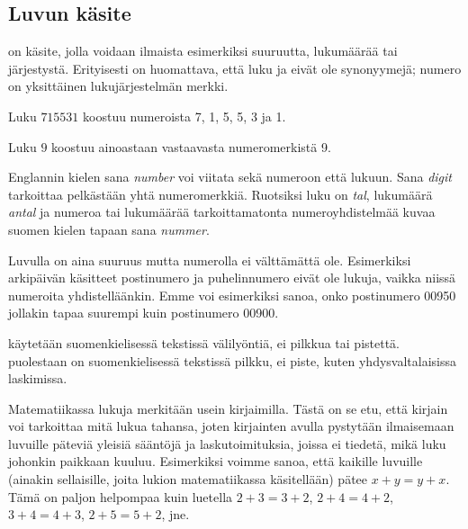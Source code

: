 


\subsection*{Luvun käsite}

 on käsite, jolla voidaan ilmaista esimerkiksi suuruutta, lukumäärää tai järjestystä. Erityisesti on huomattava, että
luku ja  eivät ole synonyymejä; numero on yksittäinen lukujärjestelmän merkki.

\begin{esimerkki}
	Luku $715531$ koostuu numeroista 7, 1, 5, 5, 3 ja 1.
	
	Luku $9$ koostuu ainoastaan vastaavasta numeromerkistä 9.
\end{esimerkki}

Englannin kielen sana \textit{number} voi viitata sekä numeroon että lukuun.
Sana \textit{digit} tarkoittaa pelkästään yhtä numeromerkkiä.
Ruotsiksi luku on \textit{tal}, lukumäärä \textit{antal} ja numeroa tai lukumäärää tarkoittamatonta
numeroyhdistelmää kuvaa suomen kielen tapaan sana \textit{nummer}.

Luvulla on aina suuruus mutta numerolla ei välttämättä ole. Esimerkiksi arkipäivän käsitteet
postinumero ja puhelinnumero eivät ole lukuja, vaikka niissä numeroita yhdistelläänkin. 
Emme voi esimerkiksi sanoa, onko postinumero 00950 jollakin tapaa suurempi kuin postinumero 00900.

 käytetään suomenkielisessä tekstissä välilyöntiä, ei pilkkua tai pistettä.
 puolestaan on suomenkielisessä tekstissä pilkku, ei piste, kuten yhdysvaltalaisissa laskimissa.

Matematiikassa lukuja merkitään usein kirjaimilla. Tästä on se etu, että kirjain voi tarkoittaa mitä lukua
tahansa, joten kirjainten avulla pystytään ilmaisemaan luvuille päteviä yleisiä sääntöjä ja laskutoimituksia, joissa ei
tiedetä, mikä luku johonkin paikkaan kuuluu. Esimerkiksi voimme sanoa, että kaikille luvuille
(ainakin sellaisille, joita lukion matematiikassa käsitellään) pätee $x+y=y+x$. Tämä on paljon helpompaa
kuin luetella $2+3=3+2$, $2+4=4+2$, $3+4=4+3$, $2+5=5+2$, jne.

